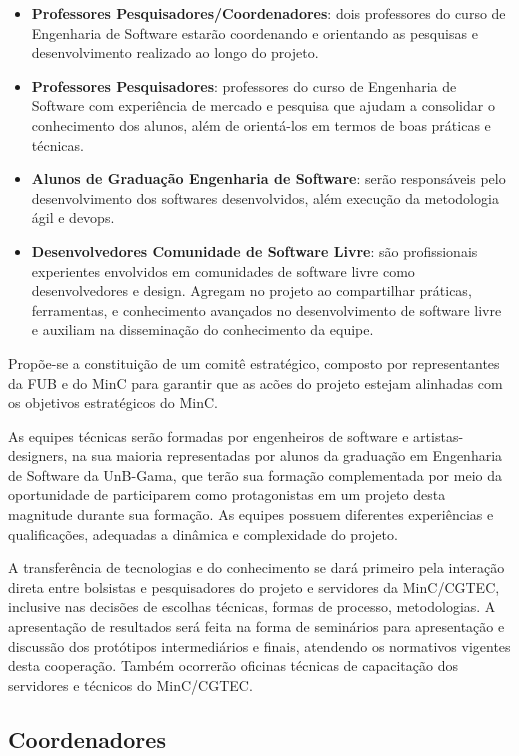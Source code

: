\begin{itemize}
 \item \textbf{Professores Pesquisadores/Coordenadores}: dois professores do curso de Engenharia de Software estarão coordenando e
 orientando as pesquisas e desenvolvimento realizado ao longo do projeto.
 \item \textbf{Professores Pesquisadores}:  professores do curso de Engenharia de Software com experiência de mercado e pesquisa que ajudam 
 a consolidar o conhecimento dos alunos, além de orientá-los em termos de boas práticas e técnicas.
 \item \textbf{Alunos de Graduação Engenharia de Software}: serão responsáveis pelo desenvolvimento dos softwares desenvolvidos, 
 além execução da metodologia ágil e devops.
 \item \textbf{Desenvolvedores Comunidade de Software Livre}: são profissionais experientes envolvidos em comunidades de software livre 
 como desenvolvedores e design. Agregam no projeto ao compartilhar práticas, ferramentas, e conhecimento avançados no desenvolvimento
 de software livre e auxiliam na disseminação do conhecimento da equipe.  
\end{itemize}

Propõe-se a constituição de um comitê estratégico, composto por representantes da FUB e do MinC para garantir que as acões do projeto estejam alinhadas com os objetivos estratégicos do MinC.

As equipes técnicas serão formadas por engenheiros de software e artistas-designers, na sua maioria representadas por alunos da graduação em Engenharia de Software da UnB-Gama, que terão sua formação complementada por meio da oportunidade de participarem como protagonistas em um projeto desta magnitude durante sua formação. As equipes possuem diferentes experiências e qualificações, adequadas a dinâmica e complexidade do projeto.

A transferência de tecnologias e do conhecimento se dará primeiro pela interação direta entre bolsistas e pesquisadores do projeto e servidores da MinC/CGTEC, inclusive nas decisões de escolhas técnicas, formas de processo, metodologias. A apresentação de resultados será feita na forma de seminários para apresentação e discussão dos protótipos intermediários e finais, atendendo os normativos vigentes desta cooperação. Também ocorrerão oficinas técnicas de capacitação dos servidores e técnicos do MinC/CGTEC.



\subsection{Coordenadores}

